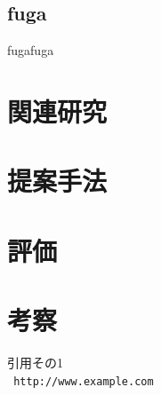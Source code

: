 \documentclass[a4j,10pt]{jsarticle}
\begin{document}
\subsection{fuga}
fugafuga

\section{関連研究}

\section{提案手法}

\section{評価}

\section{考察}

\begin{thebibliography}{99}
引用その1\\
\texttt{ http://www.example.com}
\end{thebibliography}
\end{document}
